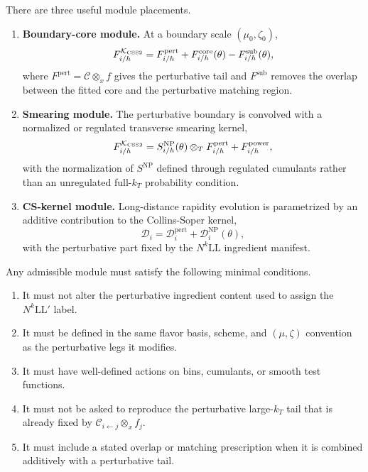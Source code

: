 \documentclass[11pt]{article}
\newcommand{\ot}{\otimes_T}
\newcommand{\ox}{\otimes_x}
\newcommand{\NP}{\mathrm{NP}}
\newcommand{\pert}{\mathrm{pert}}
\newcommand{\core}{\mathrm{core}}
\newcommand{\sub}{\mathrm{sub}}
\newcommand{\KCSS}{\mathcal K_{\rm CSS2}}
\begin{document}
There are three useful module placements.
\begin{enumerate}
  \item \textbf{Boundary-core module.}  At a boundary scale $(\mu_0,\zeta_0)$,
  \begin{equation}
    F_{i/h}^{\KCSS}
    =
    F_{i/h}^{\pert}
    +F_{i/h}^{\core}(\theta)
    -F_{i/h}^{\sub}(\theta),
    \label{eq:NP-additive-final}
  \end{equation}
  where $F^{\pert}=\mathcal C\ox f$ gives the perturbative tail and $F^{\sub}$ removes
  the overlap between the fitted core and the perturbative matching region.

  \item \textbf{Smearing module.}  The perturbative boundary is convolved with a
  normalized or regulated transverse smearing kernel,
  \begin{equation}
    F_{i/h}^{\KCSS}
    =
    S_{i/h}^{\NP}(\theta)\ot F_{i/h}^{\pert}
    +F_{i/h}^{\rm power},
    \label{eq:NP-smearing-final}
  \end{equation}
  with the normalization of $S^{\NP}$ defined through regulated cumulants rather than an
  unregulated full-$k_T$ probability condition.

  \item \textbf{CS-kernel module.}  Long-distance rapidity evolution is parametrized by
  an additive contribution to the Collins-Soper kernel,
  \begin{equation}
    \mathcal D_i
    =
    \mathcal D_i^{\pert}
    +\mathcal D_i^{\NP}(\theta),
    \label{eq:NP-D-final}
  \end{equation}
  with the perturbative part fixed by the $N^k\mathrm{LL}$ ingredient manifest.
\end{enumerate}

Any admissible module must satisfy the following minimal conditions.
\begin{enumerate}
  \item It must not alter the perturbative ingredient content used to assign the
  $N^k\mathrm{LL}'$ label.
  \item It must be defined in the same flavor basis, scheme, and $(\mu,\zeta)$ convention
  as the perturbative legs it modifies.
  \item It must have well-defined actions on bins, cumulants, or smooth test functions.
  \item It must not be asked to reproduce the perturbative large-$k_T$ tail that is already
  fixed by $\mathcal C_{i\leftarrow j}\ox f_j$.
  \item It must include a stated overlap or matching prescription when it is combined
  additively with a perturbative tail.
\end{enumerate}
\end{document}
